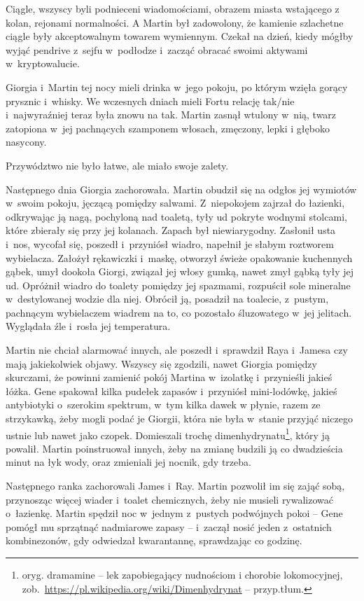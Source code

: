 \documentclass[oneside,polish,11pt,sfheadings]{mwbk}
\begin{document}
Ciągle, wszyscy byli podnieceni wiadomościami, obrazem miasta wstającego
z kolan, rejonami normalności. A Martin był zadowolony, że kamienie
szlachetne ciągle były akceptowalnym towarem wymiennym. Czekał na dzień,
kiedy mógłby wyjąć pendrive z~sejfu w~podłodze i~zacząć obracać swoimi
aktywami w~kryptowalucie.

Giorgia i~Martin tej nocy mieli drinka w~jego pokoju, po którym wzięła
gorący prysznic i~whisky. We wczesnych dniach mieli Fortu relację
tak/nie i~najwyraźniej teraz była znowu na tak. Martin zasnął wtulony w~nią, twarz zatopiona w~jej pachnących szamponem włosach, zmęczony, lepki
i głęboko nasycony.

Przywództwo nie było łatwe, ale miało swoje zalety.

Następnego dnia Giorgia zachorowała. Martin obudził się na odgłos jej
wymiotów w~swoim pokoju, jęczącą pomiędzy salwami. Z~niepokojem zajrzał
do łazienki, odkrywając ją nagą, pochyloną nad toaletą, tyły ud pokryte
wodnymi stolcami, które zbierały się przy jej kolanach. Zapach był
niewiarygodny. Zasłonił usta i~nos, wycofał się, poszedł i~przyniósł
wiadro, napełnił je słabym roztworem wybielacza. Założył rękawiczki i~maskę, otworzył świeże opakowanie kuchennych gąbek, umył dookoła Giorgi,
związał jej włosy gumką, nawet zmył gąbką tyły jej ud. Opróżnił wiadro
do toalety pomiędzy jej spazmami, rozpuścił sole mineralne w~destylowanej wodzie dla niej. Obrócił ją, posadził na toalecie, z~pustym, pachnącym wybielaczem wiadrem na to, co pozostało śluzowatego w~jej jelitach. Wyglądała źle i~rosła jej temperatura.

Martin nie chciał alarmować innych, ale poszedł i~sprawdził Raya i~Jamesa czy mają jakiekolwiek objawy. Wszyscy się zgodzili, nawet Giorgia
pomiędzy skurczami, że powinni zamienić pokój Martina w~izolatkę i~przynieśli jakieś łóżka. Gene spakował kilka pudełek zapasów i~przyniósł
mini-lodówkę, jakieś antybiotyki o~szerokim spektrum, w~tym kilka dawek
w płynie, razem ze strzykawką, żeby mogli podać je Giorgii, która nie
była w~stanie przyjąć niczego ustnie lub nawet jako czopek. Domieszali
trochę dimenhydrynatu\footnote{ oryg. dramamine -- lek zapobiegający nudnościom
i chorobie lokomocyjnej,
zob.~\url{https://pl.wikipedia.org/wiki/Dimenhydrynat} -- przyp.tłum.}, który ją powalił. Martin poinstruował innych, żeby na
zmianę budzili ją co dwadzieścia minut na łyk wody, oraz zmieniali jej
nocnik, gdy trzeba.

Następnego ranka zachorowali James i~Ray. Martin pozwolił im się zająć
sobą, przynosząc więcej wiader i~toalet chemicznych, żeby nie musieli
rywalizować o~łazienkę. Martin spędził noc w~jednym z~pustych podwójnych
pokoi -- Gene pomógł mu sprzątnąć nadmiarowe zapasy -- i~zaczął nosić
jeden z~ostatnich kombinezonów, gdy odwiedzał kwarantannę, sprawdzając
co godzinę.
\end{document}
